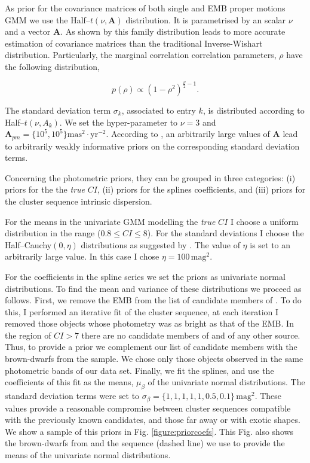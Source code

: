 As prior for the covariance matrices of both single and EMB proper motions GMM we use the Half--$t(\nu,\mathbf{A})$ distribution. It is parametrised by an scalar $\nu$ and a vector $\mathbf{A}$. As shown by \citet{Huang2013} this family distribution leads to more accurate estimation of covariance matrices than the traditional Inverse-Wishart distribution. Particularly, the marginal correlation correlation parameters, $\rho$ have the following distribution,

\begin{equation}
p(\rho) \propto (1-\rho^2)^{\frac{\nu}{2}-1}.
\end{equation}

The standard deviation term $\sigma_k$, associated to entry $k$, is distributed according to Half--$t(\nu,A_k)$. We set the hyper-parameter to $\nu=3$ and $\boldsymbol{A}_{pm}=\{10^5,10^5\}\mathrm{mas^2\cdot yr^{-2}}$. According to \citet{Huang2013}, an arbitrarily large values of $\boldsymbol{A}$ lead to arbitrarily weakly informative priors on the corresponding standard deviation terms.

Concerning the photometric priors, they can be grouped in three categories: (i) priors for the the \emph{true} $CI$, (ii) priors for the splines coefficients, and (iii) priors for the cluster sequence intrinsic dispersion. 

For the means in the univariate GMM modelling the \emph{true} $CI$ I choose a uniform distribution in the range  ($0.8\leq CI \leq8$). For the standard deviations I choose the Half--Cauchy$(0,\eta)$ distributions as suggested by \citet{Gelman2006}. The value of $\eta$ is set to an arbitrarily large value. In this case I chose $\eta=100\,\mathrm{mag}^2$.

For the coefficients in the spline series we set the priors as univariate normal distributions. To find the mean and variance of these distributions we proceed as follows. First, we remove the EMB from the list of candidate members of \citet{Bouy2015}. To do this, I performed an iterative fit of the cluster sequence, at each iteration I removed those objects whose photometry was  as bright as that of the EMB. In the region of $CI > 7$ there are no candidate members of \citet{Bouy2015} and of any other source. Thus, to provide a prior we complement our list of candidate members with the brown-dwarfs from the \citet{Faherty2012} sample. We chose only those objects observed in the same photometric bands of our data set. Finally, we fit the splines, and use the coefficients of this fit as the means, $\mu_{\beta}$ of the univariate normal distributions. The standard deviation terms were set to $\sigma_{\beta}=\{1,1,1,1,1,0.5,0.1\}\,\mathrm{mag}^2$. These values provide a reasonable compromise between cluster sequences compatible with the previously known candidates, and those far away or with exotic shapes. We show a sample of this priors in Fig. \ref{figure:priorcoefs}. This Fig. also shows the brown-dwarfs from \citet{Faherty2012} and the sequence (dashed line) we use to provide the means of the univariate normal distributions.

